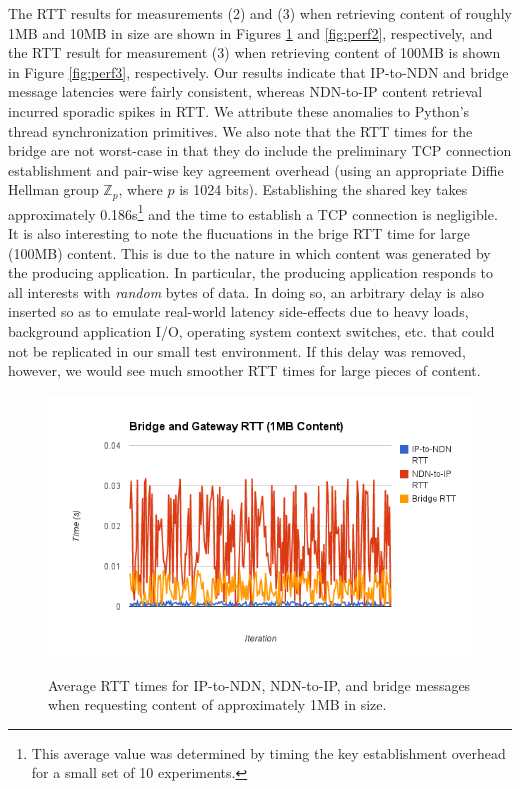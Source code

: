 The RTT results for measurements (2) and (3) when retrieving content of roughly 1MB and 10MB in size are shown in Figures \ref{fig:perf1} and \ref{fig:perf2}, respectively, and the RTT result for measurement (3) when retrieving content of 100MB is shown in Figure \ref{fig:perf3}, respectively. Our results indicate that IP-to-NDN and bridge message latencies were fairly consistent, whereas NDN-to-IP content retrieval incurred sporadic spikes in RTT. We attribute these anomalies to Python's thread synchronization primitives. We also note that the RTT times for the bridge are not worst-case in that they do include the preliminary TCP connection establishment and pair-wise key agreement overhead (using an appropriate Diffie Hellman group $\mathbb{Z}_p$, where $p$ is 1024 bits). Establishing the shared key takes approximately 0.186s\footnote{This average value was determined by timing the key establishment overhead for a small set of 10 experiments.} and the time to establish a TCP connection is negligible. It is also interesting to note the flucuations in the brige RTT time for large (100MB) content. This is due to the nature in which content was generated by the producing application. In particular, the producing application responds to all interests with \emph{random} bytes of data. In doing so, an arbitrary delay is also inserted so as to emulate real-world latency side-effects due to heavy loads, background application I/O, operating system context switches, etc. that could not be replicated in our small test environment. If this delay was removed, however, we would see much smoother RTT times for large pieces of content. 

\begin{figure}
\begin{center}
\includegraphics[scale=0.7]{./images/small.png}
\label{fig:perf1}
\caption{Average RTT times for IP-to-NDN, NDN-to-IP, and bridge messages when requesting content of approximately 1MB in size.}
\end{center}
\end{figure}

